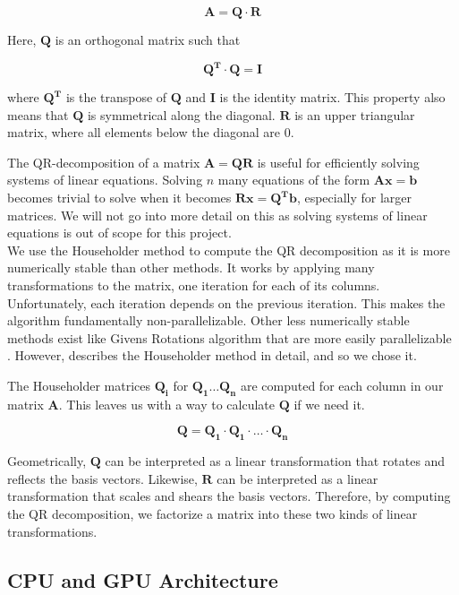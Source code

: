\[\mathbf{A} = \mathbf{Q} \cdot \mathbf{R}\]

\noindent Here, \(\mathbf{Q}\) is an orthogonal matrix such that 

\[\mathbf{Q^T \cdot Q = I}\]

where \(\mathbf{Q^T}\) is the transpose of \(\mathbf{Q}\) and \(\mathbf{I}\) is the identity matrix. This property also means that \(\mathbf{Q}\) is symmetrical along the diagonal. \(\mathbf{R}\) is an upper triangular matrix, where all elements below the diagonal are 0. 

The QR-decomposition of a matrix \(\mathbf{A = QR}\) is useful for efficiently solving systems of linear equations. Solving $n$ many equations of the form \(\mathbf{Ax = b}\) becomes trivial to solve when it becomes \(\mathbf{Rx = Q^Tb}\), especially for larger matrices.\cite[Sect. 2.10]{numericalrecipes} We will not go into more detail on this as solving systems of linear equations is out of scope for this project. \\

\noindent We use the Householder method to compute the QR decomposition as it is more numerically stable than other methods. It works by applying many transformations to the matrix, one iteration for each of its columns. Unfortunately, each iteration depends on the previous iteration. This makes the algorithm fundamentally non-parallelizable. Other less numerically stable methods exist like Givens Rotations algorithm that are more easily parallelizable \cite[Sect. 2.10.4]{numericalrecipes}. However, \cite[Sect. 11.2]{numericalrecipes} describes the Householder method in detail, and so we chose it. 

The Householder matrices \(\mathbf{Q_i}\) for \(\mathbf{Q_1 \ldots Q_{n}}\) are computed for each column in our matrix \(\mathbf{A}\). This leaves us with a way to calculate \(\mathbf{Q}\) if we need it.\cite[Sect. 2.13, 11.2]{numericalrecipes}

\[\mathbf{Q = Q_1 \cdot Q_1 \cdot \ldots \cdot Q_{n}}\]

Geometrically, \(\mathbf{Q}\) can be interpreted as a linear transformation that rotates and reflects the basis vectors. Likewise, \(\mathbf{R}\) can be interpreted as a linear transformation that scales and shears the basis vectors. Therefore, by computing the QR decomposition, we factorize a matrix into these two kinds of linear transformations. 

\newpage
\subsection{CPU and GPU Architecture}

